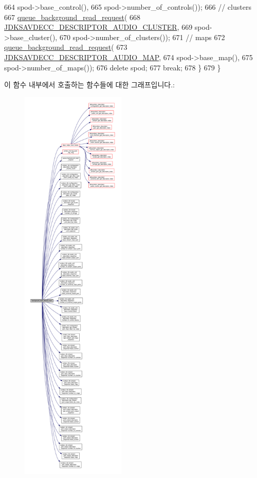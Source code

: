 \begin{DoxyCode}
664             spod->base\_control(),
665             spod->number\_of\_controls());
666         \textcolor{comment}{// clusters}
667         \hyperlink{classavdecc__lib_1_1end__station__imp_a5dcbf7253fe2b67afcc2c41cc9afe826}{queue\_background\_read\_request}(
668             \hyperlink{group__descriptor_ga3ed17cacf96ccf5d857a20c71d02f426}{JDKSAVDECC\_DESCRIPTOR\_AUDIO\_CLUSTER},
669             spod->base\_cluster(),
670             spod->number\_of\_clusters());
671         \textcolor{comment}{// maps}
672         \hyperlink{classavdecc__lib_1_1end__station__imp_a5dcbf7253fe2b67afcc2c41cc9afe826}{queue\_background\_read\_request}(
673             \hyperlink{group__descriptor_ga8b923dc5b431ec457fc26e0dcfa88104}{JDKSAVDECC\_DESCRIPTOR\_AUDIO\_MAP},
674             spod->base\_map(),
675             spod->number\_of\_maps());
676         \textcolor{keyword}{delete} spod;
677         \textcolor{keywordflow}{break};
678     \}
679 \}
\end{DoxyCode}


이 함수 내부에서 호출하는 함수들에 대한 그래프입니다.\+:
\nopagebreak
\begin{figure}[H]
\begin{center}
\leavevmode
\includegraphics[height=550pt]{classavdecc__lib_1_1end__station__imp_ac9f6c6b15267ddc8bffecf2654a6f03d_cgraph}
\end{center}
\end{figure}





